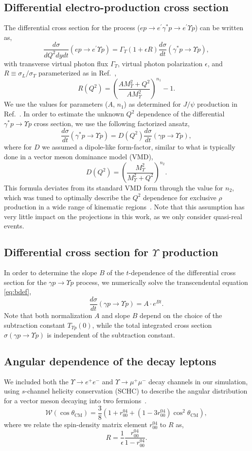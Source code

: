 \documentclass[10pt,prd,aps,nofootinbib,superscriptaddress]{revtex4}
\newcommand{\beq}{\begin{equation}}
\newcommand{\eeq}{\end{equation}}
\begin{document}
\subsection{Differential electro-production cross section}
The differential cross section for the process ($e p \to e^\prime \gamma^* p \to e^\prime \Upsilon p$) can be written as,
\beq
\frac{d\sigma}{dQ^2dydt}(e p \to e^\prime \Upsilon p) = 
\Gamma_T(1+\epsilon R)
\frac{d\sigma}{dt}(\gamma^* p \to \Upsilon p),
\eeq
with transverse virtual photon flux $\Gamma_T$, virtual photon polarization $\epsilon$, and 
$R\equiv\sigma_L/\sigma_T$ parameterized as in Ref.~\cite{Martynov:2002ez},
\beq
R(Q^2) = \left(\frac{A M_\Upsilon^2 + Q^2}{A M_\Upsilon^2}\right)^{n_1} - 1.
\eeq
We use the values for parameters ($A$, $n_1$) as determined for $J/\psi$ production in Ref.~\cite{Fiore:2009xk}.
In order to estimate the unknown $Q^2$ dependence of the differential $\gamma^* p \to \Upsilon p$ cross section, we use the following factorized ansatz,
\beq
\frac{d\sigma}{dt}(\gamma^* p \to \Upsilon p) = D(Q^2) \frac{d\sigma}{dt}(\gamma p \to \Upsilon p),
\eeq
where for $D$ we assumed a dipole-like form-factor, similar to what is typically
done in a vector meson dominance model (VMD),
\beq
D(Q^2) = \left(\frac{M_\Upsilon^2}{M_\Upsilon^2 + Q^2}\right)^{n_2}.
\eeq
This formula deviates from its standard VMD form through the value for $n_2$, which was
tuned to optimally describe the $Q^2$ dependence for exclusive $\rho$ production in a wide range
of kinematic regions~\cite{Airapetian:2000ni,Adams:1997bh,Tytgat:2011us,Liebing:2004us}.
Note that this assumption has very little impact on the projections in this work,
as we only consider quasi-real events.

\subsection{Differential cross section for $\Upsilon$ production}
In order to determine the slope $B$ of the $t$-dependence of the differential cross section for 
the $\gamma p \to \Upsilon p$ process, we numerically solve the transcendental equation \eqref{eq:bdef},
\beq
\frac{d\sigma}{dt}(\gamma p \to \Upsilon p) = A \cdot e^{Bt}.
\eeq
Note that both  normalization $A$ and slope $B$ depend on the choice of the subtraction
constant $T_{\Upsilon p} (0)$, while the total integrated cross section 
$\sigma(\gamma p \to \Upsilon p)$ is independent of the subtraction constant.

\subsection{Angular dependence of the decay leptons}
We included both the $\Upsilon \to e^+e^-$ and $\Upsilon \to \mu^+\mu^-$ decay channels
in our simulation, using $s$-channel helicity conservation (SCHC) to describe the
angular distribution for a vector meson decaying into two fermions~\cite{Breitweg:1998nh,Chekanov:2002xi,Schilling:1973ag}.
\beq
\mathcal{W}(\cos\theta_\text{CM}) = 
\frac{3}{8}(1+r^{04}_{00}+(1-3r_{00}^{04})\cos^2\theta_\text{CM}),
\eeq
where we relate the spin-density matrix element $r^{04}_{00}$ to $R$ as,
\beq
R = \frac{1}{\epsilon}\frac{r^{04}_{00}}{1-r^{04}_{00}}.
\eeq
\end{document}
